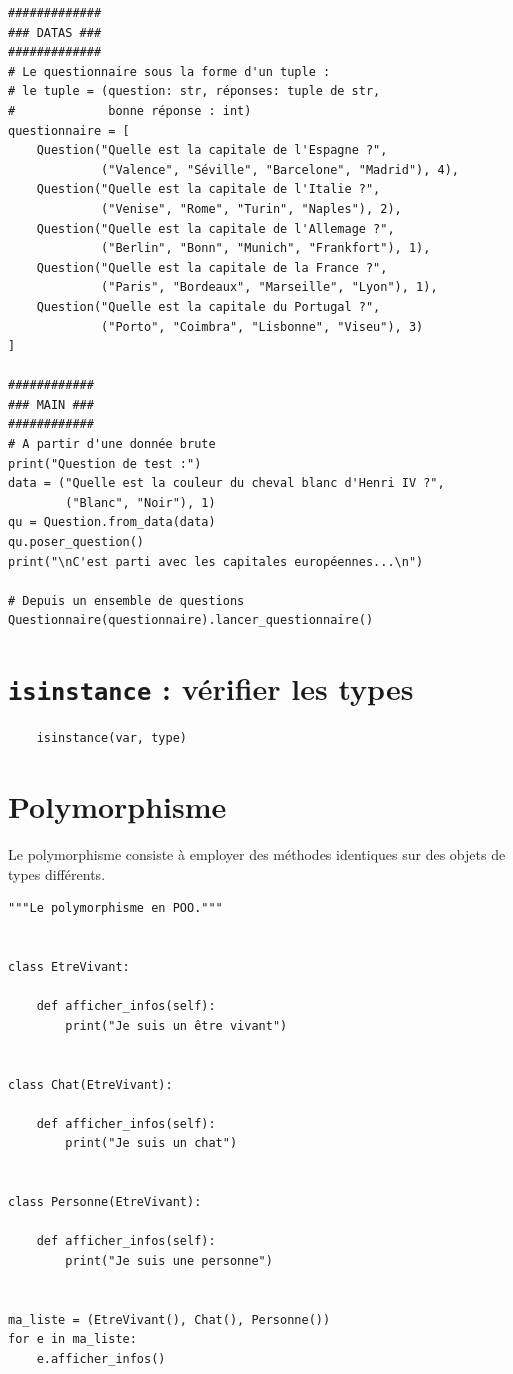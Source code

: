 \documentclass[a4paper,11pt]{book}
\begin{document}
\begin{lstlisting}
#############
### DATAS ###
#############
# Le questionnaire sous la forme d'un tuple :
# le tuple = (question: str, réponses: tuple de str, 
#             bonne réponse : int)
questionnaire = [
    Question("Quelle est la capitale de l'Espagne ?",
             ("Valence", "Séville", "Barcelone", "Madrid"), 4),
    Question("Quelle est la capitale de l'Italie ?",
             ("Venise", "Rome", "Turin", "Naples"), 2),
    Question("Quelle est la capitale de l'Allemage ?",
             ("Berlin", "Bonn", "Munich", "Frankfort"), 1),
    Question("Quelle est la capitale de la France ?",
             ("Paris", "Bordeaux", "Marseille", "Lyon"), 1),
    Question("Quelle est la capitale du Portugal ?",
             ("Porto", "Coimbra", "Lisbonne", "Viseu"), 3)
]

############
### MAIN ###
############
# A partir d'une donnée brute
print("Question de test :")
data = ("Quelle est la couleur du cheval blanc d'Henri IV ?",
        ("Blanc", "Noir"), 1)
qu = Question.from_data(data)
qu.poser_question()
print("\nC'est parti avec les capitales européennes...\n")

# Depuis un ensemble de questions
Questionnaire(questionnaire).lancer_questionnaire()
\end{lstlisting}
\medskip

\section{\texttt{isinstance} : vérifier les types}
\begin{verbatim}
    isinstance(var, type)
\end{verbatim}
\medskip

\section{Polymorphisme}
Le polymorphisme consiste à employer des méthodes identiques sur des objets de types différents.
\begin{lstlisting}
"""Le polymorphisme en POO."""


class EtreVivant:

    def afficher_infos(self):
        print("Je suis un être vivant")


class Chat(EtreVivant):

    def afficher_infos(self):
        print("Je suis un chat")


class Personne(EtreVivant):

    def afficher_infos(self):
        print("Je suis une personne")


ma_liste = (EtreVivant(), Chat(), Personne())
for e in ma_liste:
    e.afficher_infos()
\end{lstlisting}
\medskip
\end{document}
